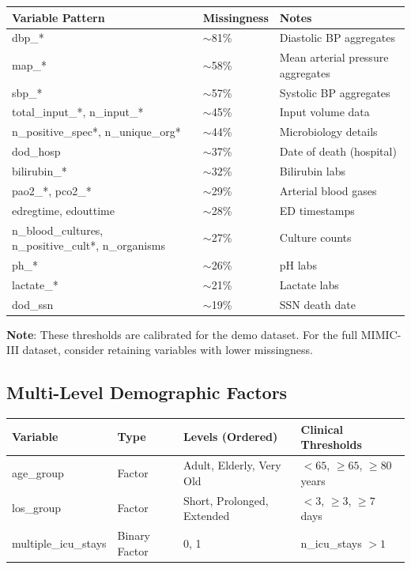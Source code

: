 \documentclass[11pt]{article}
\begin{document}
\begin{longtable}{L{4cm}L{3cm}L{7cm}}
\toprule
\textbf{Variable Pattern} & \textbf{Missingness} & \textbf{Notes} \\
\midrule
\endhead
dbp\_* & $\sim$81\% & Diastolic BP aggregates \\
map\_* & $\sim$58\% & Mean arterial pressure aggregates \\
sbp\_* & $\sim$57\% & Systolic BP aggregates \\
total\_input\_*, n\_input\_* & $\sim$45\% & Input volume data \\
n\_positive\_spec*, n\_unique\_org* & $\sim$44\% & Microbiology details \\
dod\_hosp & $\sim$37\% & Date of death (hospital) \\
bilirubin\_* & $\sim$32\% & Bilirubin labs \\
pao2\_*, pco2\_* & $\sim$29\% & Arterial blood gases \\
edregtime, edouttime & $\sim$28\% & ED timestamps \\
n\_blood\_cultures, n\_positive\_cult*, n\_organisms & $\sim$27\% & Culture counts \\
ph\_* & $\sim$26\% & pH labs \\
lactate\_* & $\sim$21\% & Lactate labs \\
dod\_ssn & $\sim$19\% & SSN death date \\
\bottomrule
\end{longtable}

\textbf{Note}: These thresholds are calibrated for the demo dataset. For the full MIMIC-III dataset, consider retaining variables with lower missingness.

\subsection{Multi-Level Demographic Factors}

\begin{longtable}{L{2.5cm}L{2.5cm}L{4cm}L{5cm}}
\toprule
\textbf{Variable} & \textbf{Type} & \textbf{Levels (Ordered)} & \textbf{Clinical Thresholds} \\
\midrule
\endhead
age\_group & Factor & Adult, Elderly, Very Old & $<65$, $\geq65$, $\geq80$ years \\
los\_group & Factor & Short, Prolonged, Extended & $<3$, $\geq3$, $\geq7$ days \\
multiple\_icu\_stays & Binary Factor & 0, 1 & n\_icu\_stays $>1$ \\
\bottomrule
\end{longtable}
\end{document}
